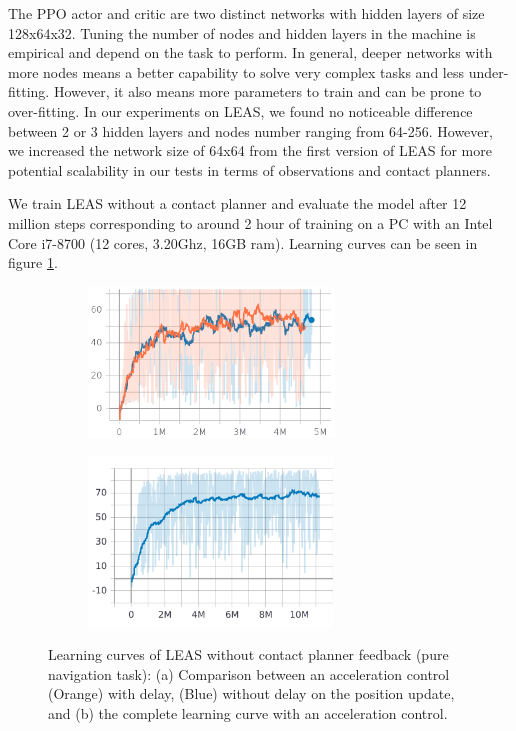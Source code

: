 The PPO actor and critic are two distinct networks with hidden layers of size 128x64x32. Tuning the number of nodes and hidden layers in the machine is empirical and depend on the task to perform. In general, deeper networks with more nodes means a better capability to solve very complex tasks and less under-fitting. However, it also means more parameters to train and can be prone to over-fitting. In our experiments on LEAS, we found no noticeable difference between 2 or 3 hidden layers and nodes number ranging from 64-256. However, we increased the network size of 64x64 from the first version of LEAS \cite{LEAS} for more potential scalability in our tests in terms of observations and contact planners.

We train LEAS without a contact planner and evaluate the model after 12 million steps corresponding to around 2 hour of training on a PC with an Intel Core i7-8700 (12 cores, 3.20Ghz, 16GB ram). Learning curves can be seen in figure \ref{fig:control_LEAS_learning_curves}.

\begin{figure}[ht]
    \centering
    \begin{subfigure}[t]{0.49\linewidth}
    \includegraphics[width=\textwidth, height=4cm]{Figures/Chapter_LEAS/learning_curves_P1.png}
    \caption{}
    \end{subfigure}
    \begin{subfigure}[t]{0.49\linewidth}
    \includegraphics[width=\textwidth, height=4.5cm, trim={0cm 0.2cm 0cm 0cm},clip]{Figures/Chapter_LEAS/learning_curve_leas_p1.png}
    \caption{}
    \end{subfigure}
    \caption{Learning curves of LEAS without contact planner feedback (pure navigation task): (a) Comparison between an acceleration control (Orange) with delay, (Blue) without delay on the position update, and (b) the complete learning curve with an acceleration control.}
    \label{fig:control_LEAS_learning_curves}
\end{figure}


